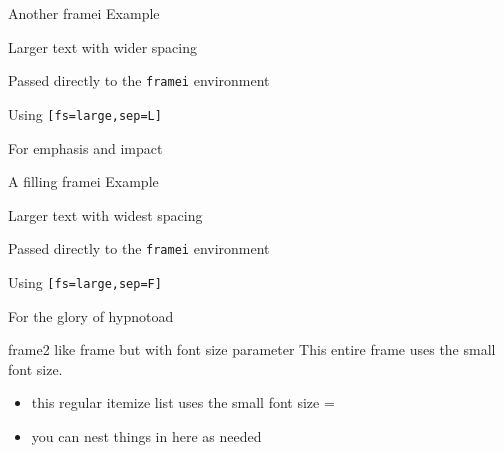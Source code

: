\documentclass[11pt,compress,t,notes=noshow, xcolor=table]{beamer}
\begin{document}

\begin{framei}[fs=large,sep=L]{Another framei Example}
  \item Larger text with wider spacing
  \item Passed directly to the \texttt{framei} environment
  \item Using \texttt{[fs=large,sep=L]}
  \item For emphasis and impact
\end{framei}


\begin{framei}[fs=large,sep=F]{A filling framei Example}
  \item Larger text with widest spacing
  \item Passed directly to the \texttt{framei} environment
  \item Using \texttt{[fs=large,sep=F]}
  \item For the glory of hypnotoad
\end{framei}


\begin{frame2}[small]{frame2 like frame but with font size parameter}
  This entire frame uses the small font size.
  
  \begin{itemize}
    \item this regular itemize list uses the small font size
=    \item you can nest things in here as needed
  \end{itemize}
\end{frame2}

\endlecture
\end{document}
